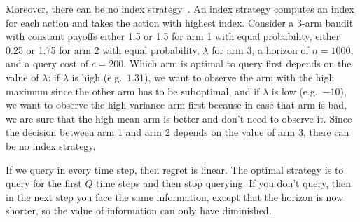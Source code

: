 \documentclass[a4paper]{article}
\begin{document}
Moreover, there can be no index strategy~\citep[Ex.~4]{Hay12}.
An index strategy computes an index for each action
and takes the action with highest index.
Consider a 3-arm bandit with constant payoffs
either 1.5 or 1.5 for arm 1 with equal probability,
either 0.25 or 1.75 for arm 2 with equal probability,
$\lambda$ for arm 3,
a horizon of $n = 1000$,
and a query cost of $c = 200$.
Which arm is optimal to query first depends on the value of $\lambda$:
if $\lambda$ is high (e.g.\ $1.31$), we want to observe the arm with the high maximum since the other arm has to be suboptimal, and if $\lambda$ is low (e.g.\ $-10$), we want to observe the high variance arm first because in case that arm is bad, we are sure that the high mean arm is better and don't need to observe it.
Since the decision between arm 1 and arm 2 depends on the value of arm 3,
there can be no index strategy.



If we query in every time step, then regret is linear.
The optimal strategy is to query for the first $Q$ time steps and then stop querying.
If you don't query, then in the next step you face the same information, except that the horizon is now shorter,
so the value of information can only have diminished.
\end{document}
